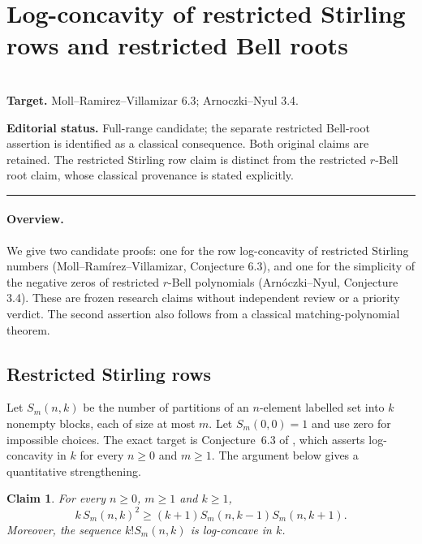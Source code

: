\documentclass[11pt,a4paper]{article}
\newtheorem{SourceRbiRtheorem}{Claim}
\begin{document}
\clearpage

\section{Log-concavity of restricted Stirling rows and restricted Bell roots}
\label{section:R18R}
\\[3pt]
\noindent\textbf{Target.} Moll--Ramirez--Villamizar 6.3; Arnoczki--Nyul 3.4.

\noindent\textbf{Editorial status.} Full-range candidate; the separate restricted Bell-root assertion is identified as a classical consequence. Both original claims are retained. The restricted Stirling row claim is distinct from the restricted $r$-Bell root claim, whose classical provenance is stated explicitly.

\smallskip\hrule\medskip



\begingroup
\newcommand{\lc}{\text{log-concave}}
\setcounter{equation}{0}
\renewcommand{\theequation}{\thesection.\arabic{equation}}
\renewcommand{\theHequation}{R18R.\arabic{equation}}
\paragraph{Overview.}
We give two candidate proofs: one for the row log-concavity of restricted
Stirling numbers (Moll--Ram\'{i}rez--Villamizar, Conjecture 6.3), and
one for the simplicity of the negative zeros of restricted
$r$-Bell polynomials (Arn\'{o}czki--Nyul, Conjecture 3.4).
These are frozen research claims without independent review or a priority verdict.
The second assertion also follows from a classical matching-polynomial theorem.


\subsection{Restricted Stirling rows}
Let $S_m(n,k)$ be the number of partitions of an $n$-element labelled
set into $k$ nonempty blocks, each of size at most $m$.
Let $S_m(0,0)=1$ and use zero for impossible choices. The exact target is
Conjecture~6.3 of \cite{R18R:MRV}, which asserts log-concavity in $k$ for every
$n\ge 0$ and $m\ge 1$. The argument below gives a quantitative strengthening.

\begin{SourceRbiRtheorem}
For every $n\ge 0$, $m\ge 1$ and $k\ge 1$,
\[
 k\,S_m(n,k)^2\ge (k+1)S_m(n,k-1)S_m(n,k+1).
\]
Moreover, the sequence $k!S_m(n,k)$ is log-concave in $k$.
\end{SourceRbiRtheorem}
\end{document}
